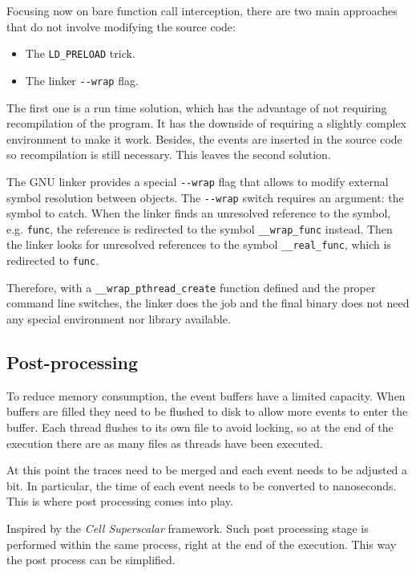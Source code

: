 Focusing now on bare function call interception, there are two main approaches
that do not involve modifying the source code:

\begin{itemize}
\item The \verb:LD_PRELOAD: trick.
\item The linker \verb:--wrap: flag.
\end{itemize}

The first one is a run time solution, which has the advantage of not requiring
recompilation of the program.  It has the downside of requiring a slightly
complex environment to make it work.  Besides, the events are inserted in the
source code so recompilation is still necessary.  This leaves the second
solution.

The GNU linker provides a special \verb:--wrap: flag that allows to modify
external symbol resolution between objects.  The \verb:--wrap: switch requires
an argument: the symbol to catch.  When the linker finds an unresolved reference
to the symbol, e.g. \verb:func:, the reference is redirected to the symbol
\verb:__wrap_func: instead.  Then the linker looks for unresolved references to
the symbol \verb:__real_func:, which is redirected to \verb:func:.

Therefore, with a \verb:__wrap_pthread_create: function defined and the proper
command line switches, the linker does the job and the final binary does not
need any special environment nor library available.


\subsection{Post-processing}

To reduce memory consumption, the event buffers have a limited capacity.  When
buffers are filled they need to be flushed to disk to allow more events to enter
the buffer.  Each thread flushes to its own file to avoid locking, so at the end
of the execution there are as many files as threads have been executed.

At this point the traces need to be merged and each event needs to be adjusted a
bit.  In particular, the time of each event needs to be converted to
nanoseconds.  This is where post processing comes into play.

Inspired by the \emph{Cell Superscalar} framework.  Such post processing stage
is performed within the same process, right at the end of the execution.  This
way the post process can be simplified.

